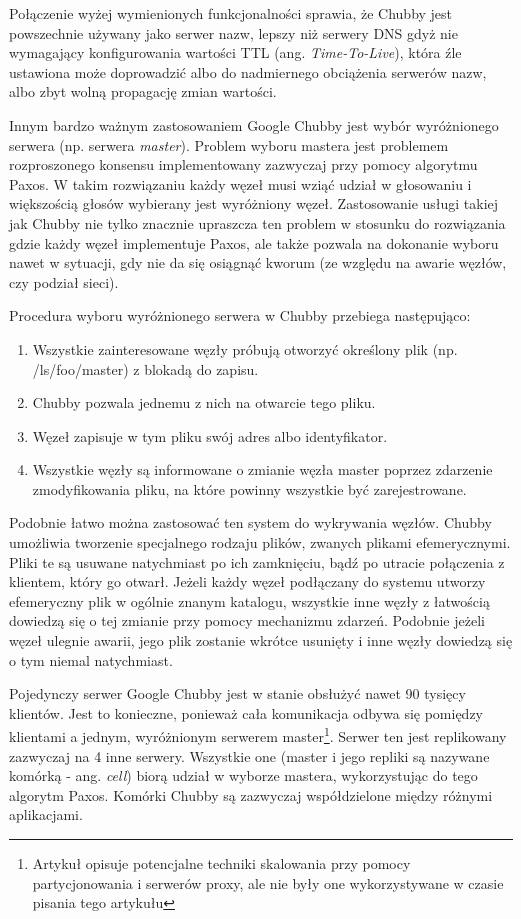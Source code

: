 Połączenie wyżej wymienionych funkcjonalności sprawia, że Chubby jest powszechnie używany jako serwer nazw, lepszy niż serwery DNS gdyż nie wymagający konfigurowania wartości TTL (ang. \emph{Time-To-Live}), która źle ustawiona może doprowadzić albo do nadmiernego obciążenia serwerów nazw, albo zbyt wolną propagację zmian wartości.

Innym bardzo ważnym zastosowaniem Google Chubby jest wybór wyróżnionego serwera (np. serwera \emph{master}).
Problem wyboru mastera jest problemem rozproszonego konsensu implementowany zazwyczaj przy pomocy algorytmu Paxos.
W takim rozwiązaniu każdy węzeł musi wziąć udział w głosowaniu i większością głosów wybierany jest wyróżniony węzeł.
Zastosowanie usługi takiej jak Chubby nie tylko znacznie upraszcza ten problem w stosunku do rozwiązania gdzie każdy węzeł implementuje Paxos, ale także pozwala na dokonanie wyboru nawet w sytuacji, gdy nie da się osiągnąć kworum (ze względu na awarie węzłów, czy podział sieci).

Procedura wyboru wyróżnionego serwera w Chubby przebiega następująco:

\begin{enumerate}
 \item Wszystkie zainteresowane węzły próbują otworzyć określony plik (np. /ls/foo/master) z blokadą do zapisu.
 \item Chubby pozwala jednemu z nich na otwarcie tego pliku.
 \item Węzeł zapisuje w tym pliku swój adres albo identyfikator.
 \item Wszystkie węzły są informowane o zmianie węzła master poprzez zdarzenie zmodyfikowania pliku, na które powinny wszystkie być zarejestrowane.
\end{enumerate}

Podobnie łatwo można zastosować ten system do wykrywania węzłów.
Chubby umożliwia tworzenie specjalnego rodzaju plików, zwanych plikami efemerycznymi.
Pliki te są usuwane natychmiast po ich zamknięciu, bądź po utracie połączenia z klientem, który go otwarł.
Jeżeli każdy węzeł podłączany do systemu utworzy efemeryczny plik w ogólnie znanym katalogu, wszystkie inne węzły z łatwością dowiedzą się o tej zmianie przy pomocy mechanizmu zdarzeń.
Podobnie jeżeli węzeł ulegnie awarii, jego plik zostanie wkrótce usunięty i inne węzły dowiedzą się o tym niemal natychmiast.

Pojedynczy serwer Google Chubby jest w stanie obsłużyć nawet 90 tysięcy klientów.
Jest to konieczne, ponieważ cała komunikacja odbywa się pomiędzy klientami a jednym, wyróżnionym serwerem master\footnote{Artykuł \cite{google-chubby} opisuje potencjalne techniki skalowania przy pomocy partycjonowania i serwerów proxy, ale nie były one wykorzystywane w czasie pisania tego artykułu}.
Serwer ten jest replikowany zazwyczaj na 4 inne serwery.
Wszystkie one (master i jego repliki są nazywane komórką - ang. \emph{cell}) biorą udział w wyborze mastera, wykorzystując do tego algorytm Paxos.
Komórki Chubby są zazwyczaj współdzielone między różnymi aplikacjami.

